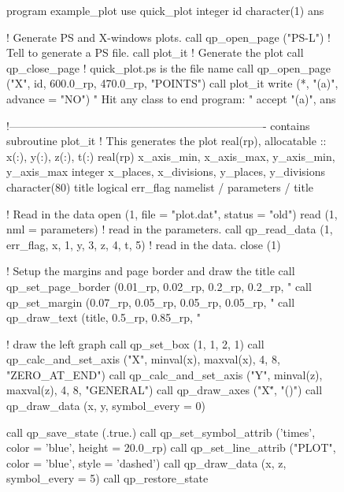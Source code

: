 \begin{figure}
\footnotesize
\begin{listing}{1}
  program example_plot
    use quick_plot
    integer id
    character(1) ans
  
    ! Generate PS and X-windows plots.
    call qp_open_page ("PS-L")  ! Tell \quickplot to generate a PS file.
    call plot_it              ! Generate the plot
    call qp_close_page        ! quick_plot.ps is the file name
    call qp_open_page ("X", id, 600.0_rp, 470.0_rp, "POINTS")
    call plot_it
    write (*, "(a)", advance = "NO") " Hit any class to end program: "
    accept "(a)", ans

  !----------------------------------------------------------------------
  contains
  subroutine plot_it                             ! This generates the plot
    real(rp), allocatable :: x(:), y(:), z(:), t(:)
    real(rp) x_axis_min, x_axis_max, y_axis_min, y_axis_max
    integer x_places, x_divisions, y_places, y_divisions
    character(80) title
    logical err_flag
    namelist / parameters / title

    ! Read in the data
    open (1, file = "plot.dat", status = "old")
    read (1, nml = parameters)                  ! read in the parameters.
    call qp_read_data (1, err_flag, x, 1, y, 3, z, 4, t, 5) ! read in the data.
    close (1)

    ! Setup the margins and page border and draw the title
    call qp_set_page_border (0.01_rp, 0.02_rp, 0.2_rp, 0.2_rp, "%
    call qp_set_margin (0.07_rp, 0.05_rp, 0.05_rp, 0.05_rp, "%
    call qp_draw_text (title, 0.5_rp, 0.85_rp, "%

    ! draw the left graph
    call qp_set_box (1, 1, 2, 1)
    call qp_calc_and_set_axis ("X", minval(x), maxval(x), 4, 8, "ZERO_AT_END")
    call qp_calc_and_set_axis ("Y", minval(z), maxval(z), 4, 8, "GENERAL")
    call qp_draw_axes ("X\dlab\u", "\gb(\A)")
    call qp_draw_data (x, y, symbol_every = 0)

    call qp_save_state (.true.)
    call qp_set_symbol_attrib ('times', color = 'blue', height = 20.0_rp)
    call qp_set_line_attrib ("PLOT", color = 'blue', style = 'dashed')
    call qp_draw_data (x, z, symbol_every = 5)
    call qp_restore_state


\end{listing}
\end{figure}
